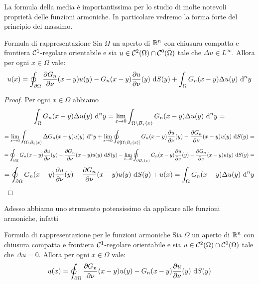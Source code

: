 \documentclass{article}
\begin{document}
La formula della media è importantissima per lo studio di molte notevoli proprietà delle funzioni armoniche. In particolare vedremo la forma forte del principio del massimo.

\begin{theorem}{Formula di rappresentazione}{}
    Sia $\Omega$ un aperto di $\mathbb{R}^n$ con chiusura compatta e frontiera $\mathcal{C}^1$-regolare orientabile e sia $u \in \mathcal{C}^2(\Omega)\cap\mathcal{C}^0(\bar{\Omega})$ tale che $\Delta u \in L^\infty$. Allora per ogni $x \in \Omega$ vale:
    \[u(x) = \oint_{\partial\Omega} \frac{\partial G_n}{\partial \nu}(x-y) u(y) - G_n(x-y)\frac{\partial u}{\partial \nu}(y) \text{ d} S(y) + \int_\Omega G_n(x-y)\Delta u(y)\text{ d}^n y\]
\end{theorem}
\begin{proof}
    Per ogni $x\in\Omega$ abbiamo
    \[\int_\Omega G_n(x-y)\Delta u(y)\text{ d}^n y = \lim_{\varepsilon\to 0} \int_{\Omega\setminus B_\varepsilon(x)} G_n(x-y)\Delta u(y)\text{ d}^n y =\]
    \[= \lim_{\varepsilon\to 0} \int_{\Omega\setminus B_\varepsilon(x)}\Delta G_n(x-y) u(y)\text{ d}^n y + \lim_{\varepsilon\to 0}\oint_{\partial[\Omega\setminus B_\varepsilon(x)]} G_n(x-y)\frac{\partial u}{\partial \nu}(y) - \frac{\partial G_n}{\partial \nu}(x-y) u(y) \text{ d} S(y) = \]
    \[= \oint_{\partial\Omega} G_n(x-y)\frac{\partial u}{\partial \nu}(y) - \frac{\partial G_n}{\partial \nu}(x-y) u(y) \text{ d} S(y) - \lim_{\varepsilon\to 0}\oint_{\partial B_\varepsilon(x)} G_n(x-y)\frac{\partial u}{\partial \nu}(y) - \frac{\partial G_n}{\partial \nu}(x-y) u(y) \text{ d} S(y) = \]
    \[= \oint_{\partial\Omega} G_n(x-y)\frac{\partial u}{\partial \nu}(y) - \frac{\partial G_n}{\partial \nu}(x-y) u(y) \text{ d} S(y) + u(x) = \int_\Omega G_n(x-y)\Delta u(y)\text{ d}^n y\]
\end{proof}

Adesso abbiamo uno strumento potensissimo da applicare alle funzioni armoniche, infatti

\begin{corollary}{Formula di rappresentazione per le funzioni armoniche}{}
    Sia $\Omega$ un aperto di $\mathbb{R}^n$ con chiusura compatta e frontiera $\mathcal{C}^1$-regolare orientabile e sia $u \in \mathcal{C}^2(\Omega)\cap\mathcal{C}^0(\bar{\Omega})$ tale che $\Delta u = 0$. Allora per ogni $x \in \Omega$ vale:
    \[u(x) = \oint_{\partial\Omega} \frac{\partial G_n}{\partial \nu}(x-y) u(y) - G_n(x-y)\frac{\partial u}{\partial \nu}(y) \text{ d} S(y)\]
\end{corollary}
\end{document}
